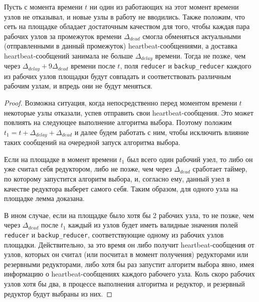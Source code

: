 \begin{lemma}
\label{ElectionLiveness}
    Пусть с момента времени $t$ ни один из работающих на этот момент времени узлов не отказывал, и новые узлы в работу не вводились. Также положим, что сеть на площадке обладает достаточным качеством для того, чтобы каждая пара рабочих узлов за промежуток времени $\Delta_{dead}$ смогла обменяться актуальными (отправленными в данный промежуток) heartbeat-со\-об\-ще\-ниями, а доставка heartbeat-со\-об\-ще\-ний занимала не больше $\Delta_{delay}$ времени. Тогда не позже, чем через $\Delta_{delay} + 9\Delta_{dead}$ времени после $t$, поля \texttt{reducer} и \texttt{backup\_reducer} каждого из рабочих узлов площадки будут совпадать и соответствовать различным рабочим узлам, и впредь они не будут меняться.
\end{lemma}
\begin{proof}
    Возможна ситуация, когда непосредственно перед моментом времени $t$ некоторые узлы отказали, успев отправить свои heartbeat-со\-об\-ще\-ния. Это может повлиять на следующее выполнение алгоритма выбора. Поэтому положим $t_1 = t + \Delta_{delay} + \Delta_{dead}$ и далее будем работать с ним, чтобы исключить влияние таких сообщений на очередной запуск алгоритма выбора.

    Если на площадке в момент времени $t_1$ был всего один рабочий узел, то либо он уже считал себя редуктором, либо не позже, чем через $\Delta_{dead}$ сработает таймер, по которому запустится алгоритм выбора, и, согласно ему, данный узел в качестве редуктора выберет самого себя. Таким образом, для одного узла на площадке лемма доказана.
    
    В ином случае, если на площадке было хотя бы 2 рабочих узла, то не позже, чем через $\Delta_{dead}$ после $t_1$ каждый из узлов будет иметь валидные значения полей \texttt{reducer} и \texttt{backup\_reducer}, соответствующие одному из рабочих узлов площадки. Действительно, за это время он либо получит heartbeat-со\-об\-ще\-ния от узлов, которых он считал (или посчитал в момент получения) редукторами или резервными редукторами, либо хотя бы раз запустит алгоритм выбора явно, имея информацию о heartbeat-со\-об\-ще\-ниях каждого рабочего узла. Коль скоро рабочих узлов хотя бы два, в процессе выполнения алгоритма и редуктор, и резервный редуктор будут выбраны из них.
    

\end{proof}
